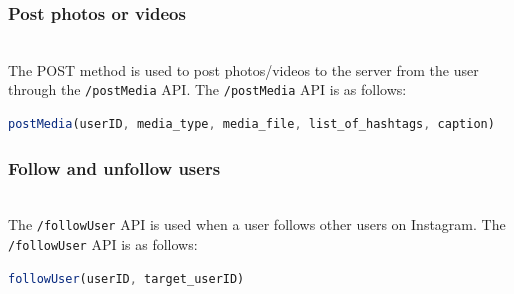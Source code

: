 \subsubsection{Post photos or videos}\label{FgFC6KHHZt7yOm2fd0xDI}
\\
The POST method is used to post photos/videos to the server from the user through the \texttt{/postMedia} API. The
\texttt{/postMedia} API is as follows:

\begin{lstlisting}[language=JavaScript]
postMedia(userID, media_type, media_file, list_of_hashtags, caption)
\end{lstlisting}

\begin{table}[htbp]
\centering
\small
{}
\end{table}

\subsubsection{Follow and unfollow users}\label{BBv7idRMNfUVDqoTfLtj9}
\\
The \texttt{/followUser} API is used when a user follows other users on Instagram. The \texttt{/followUser} API is as follows:

\begin{lstlisting}[language=JavaScript]
followUser(userID, target_userID)
\end{lstlisting}

\begin{table}[htbp]
\centering
\small
{}
\end{table}

